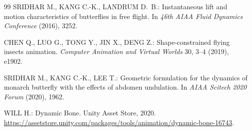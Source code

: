 \documentclass[12pt]{article}
\begin{document}
\begin{thebibliography}{99}
SRIDHAR M., KANG C.-K., LANDRUM D.~B.:
Instantaneous lift and motion characteristics of butterflies in free flight.
In \textit{46th AIAA Fluid Dynamics Conference} (2016), 3252.

CHEN Q., LUO G., TONG Y., JIN X., DENG Z.:
Shape-constrained flying insects animation.
\textit{Computer Animation and Virtual Worlds} 30, 3--4 (2019), e1902.

SRIDHAR M., KANG C.-K., LEE T.:
Geometric formulation for the dynamics of monarch butterfly with the effects
of abdomen undulation.
In \textit{AIAA Scitech 2020 Forum} (2020), 1962.

WILL H.:
Dynamic Bone.
Unity Asset Store, 2020.
\url{https://assetstore.unity.com/packages/tools/animation/dynamic-bone-16743}.

\end{thebibliography}
\end{document}
